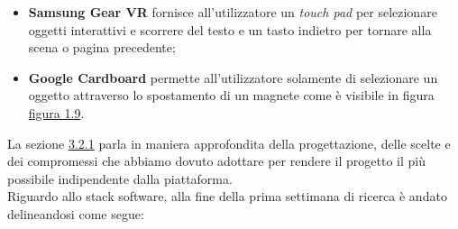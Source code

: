 \begin{itemize}
	\item \textbf{Samsung Gear VR} fornisce all'utilizzatore un \textit{touch pad} per selezionare oggetti interattivi e scorrere del testo e un tasto indietro per tornare alla scena o pagina precedente;
	\item \textbf{Google Cardboard} permette all'utilizzatore solamente di selezionare un oggetto attraverso lo spostamento di un magnete come è visibile in figura \hyperlink{gc}{figura 1.9}.
\end{itemize}

La sezione \hyperlink{3.2.1}{3.2.1}  parla in maniera approfondita della progettazione, delle scelte e dei compromessi che abbiamo dovuto adottare per rendere il progetto il più possibile indipendente dalla piattaforma. \\
Riguardo allo stack software, alla fine della prima settimana di ricerca è andato delineandosi come segue:

